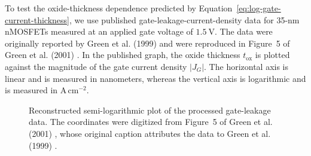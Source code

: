 \documentclass[12pt]{article}
\begin{document}
To test the oxide-thickness dependence predicted by Equation~\eqref{eq:log-gate-current-thickness}, we use published gate-leakage-current-density data for 35-nm nMOSFETs measured at an applied gate voltage of \(1.5~\mathrm{V}\). The data were originally reported by Green et al. (1999) and were reproduced in Figure~5 of Green et al. (2001) \cite{green1999limits,green2001review}. In the published graph, the oxide thickness \(t_{\mathrm{ox}}\) is plotted against the magnitude of the gate current density \(\left|J_G\right|\). The horizontal axis is linear and is measured in nanometers, whereas the vertical axis is logarithmic and is measured in \(\mathrm{A\,cm^{-2}}\).

\begin{figure}[H]
    \begin{singlespace}
        \centering
        \caption{Reconstructed semi-logarithmic plot of the processed gate-leakage data. The coordinates were digitized from Figure~5 of Green et al. (2001) \cite{green2001review}, whose original caption attributes the data to Green et al. (1999) \cite{green1999limits}.}
        \label{fig:reconstructed-gate-leakage}
    \end{singlespace}
\end{figure}
\end{document}

